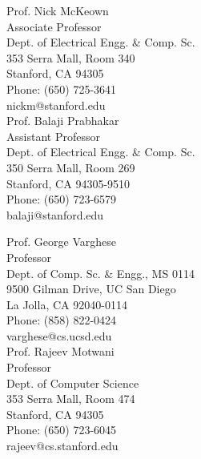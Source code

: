 \documentclass[10pt,a4]{article}
\begin{document}
\begin{small}
\begin{footnotesize}
\begin{multicols}{2} 
\noindent 
Prof. Nick McKeown \\
Associate Professor \\
Dept. of Electrical Engg. \& Comp. Sc. \\
353 Serra Mall, Room 340 \\
Stanford, CA 94305 \\
Phone: (650) 725-3641 \\
nickm@stanford.edu \\

\noindent
Prof. Balaji Prabhakar\\
Assistant Professor \\
Dept. of Electrical Engg. \& Comp. Sc. \\
350 Serra Mall, Room 269 \\
Stanford, CA 94305-9510 \\
Phone: (650) 723-6579 \\
balaji@stanford.edu \\

\columnbreak

\noindent
Prof. George Varghese\\
Professor \\
Dept. of Comp. Sc. \& Engg., MS 0114 \\
9500 Gilman Drive, UC San Diego \\
La Jolla, CA 92040-0114 \\
Phone: (858) 822-0424 \\
varghese@cs.ucsd.edu \\


\noindent
Prof. Rajeev Motwani \\
Professor \\
Dept. of Computer Science  \\
353 Serra Mall, Room 474 \\
Stanford, CA 94305 \\
Phone: (650) 723-6045 \\
rajeev@cs.stanford.edu \\

\end{multicols}


\end{footnotesize}
\end{small}
\end{document}
